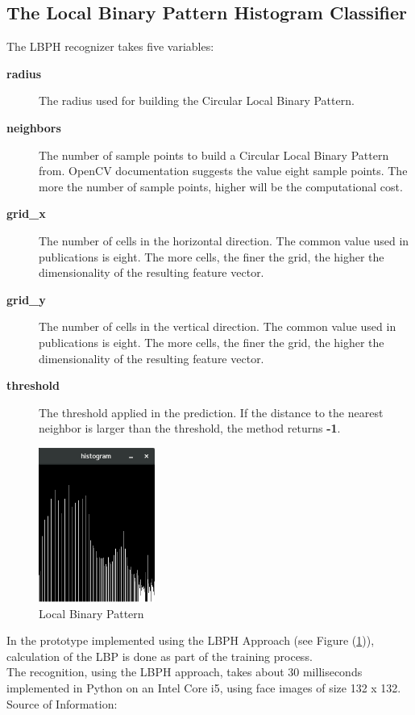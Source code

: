 \subsection{The Local Binary Pattern Histogram Classifier}
The LBPH recognizer takes five variables: \\
\begin{description}
  \item[\textbf{radius}] \quad
  The radius used for building the Circular Local Binary Pattern.

  \item[\textbf{neighbors}] \quad
  The number of sample points to build a Circular Local Binary Pattern from.
  OpenCV documentation suggests the value eight sample points.
  The more the number of sample points, higher will be the computational cost.

  \item[\textbf{grid\_x}] \quad
  The number of cells in the horizontal direction.
  The common value used in publications is eight.
  The more cells, the finer the grid, the higher the dimensionality of the resulting feature vector.

  \item[\textbf{grid\_y}] \quad
  The number of cells in the vertical direction.
  The common value used in publications is eight.
  The more cells, the finer the grid, the higher the dimensionality of the resulting feature vector.

  \item[\textbf{threshold}] \quad
  The threshold applied in the prediction.
  If the distance to the nearest neighbor is larger than the threshold, the method returns \textbf{-1}.
\end{description}

\begin{figure}[!t]
\centering
\includegraphics[width=1.5in]{./histogram.png}
\caption{Local Binary Pattern}
\label{fig:lbph}
\end{figure}

In the prototype implemented using the LBPH Approach (see Figure (\ref{fig:lbph})), calculation of the
LBP is done as part of the training process. \\
The recognition, using the LBPH approach, takes about 30 milliseconds
implemented in Python on an Intel Core i5, using face images of size 132 x 132. \\

Source of Information: \cite{MTurkAPentland}
